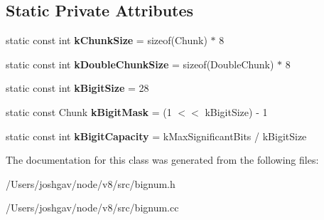 \subsection*{Static Private Attributes}
\begin{DoxyCompactItemize}
\item 
static const int {\bfseries k\+Chunk\+Size} = sizeof(Chunk) $\ast$ 8\hypertarget{classv8_1_1internal_1_1_bignum_a18a43492f6c8dfdc341f72dddc89b057}{}\label{classv8_1_1internal_1_1_bignum_a18a43492f6c8dfdc341f72dddc89b057}

\item 
static const int {\bfseries k\+Double\+Chunk\+Size} = sizeof(Double\+Chunk) $\ast$ 8\hypertarget{classv8_1_1internal_1_1_bignum_a6221cea7a11457edd926f543b4540427}{}\label{classv8_1_1internal_1_1_bignum_a6221cea7a11457edd926f543b4540427}

\item 
static const int {\bfseries k\+Bigit\+Size} = 28\hypertarget{classv8_1_1internal_1_1_bignum_a44147726a327f3ba619f43514ff44298}{}\label{classv8_1_1internal_1_1_bignum_a44147726a327f3ba619f43514ff44298}

\item 
static const Chunk {\bfseries k\+Bigit\+Mask} = (1 $<$$<$ k\+Bigit\+Size) -\/ 1\hypertarget{classv8_1_1internal_1_1_bignum_a72324a099ec8939d5d2848c173352bb9}{}\label{classv8_1_1internal_1_1_bignum_a72324a099ec8939d5d2848c173352bb9}

\item 
static const int {\bfseries k\+Bigit\+Capacity} = k\+Max\+Significant\+Bits / k\+Bigit\+Size\hypertarget{classv8_1_1internal_1_1_bignum_a33eb4dc3440d4877c65d1aeb39285f14}{}\label{classv8_1_1internal_1_1_bignum_a33eb4dc3440d4877c65d1aeb39285f14}

\end{DoxyCompactItemize}


The documentation for this class was generated from the following files\+:\begin{DoxyCompactItemize}
\item 
/\+Users/joshgav/node/v8/src/bignum.\+h\item 
/\+Users/joshgav/node/v8/src/bignum.\+cc\end{DoxyCompactItemize}
